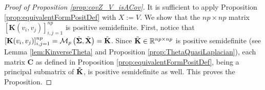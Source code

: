 \documentclass[12pt]{article}
\theoremstyle{plain}
\newtheorem{proposition}{Proposition}
\theoremstyle{remark}
\newtheorem{notation}{Notation}
\newcommand{\round}[1]{\left( #1 \right)}
\newcommand{\abs}[1]{\left| #1 \right|}
\newcommand{\R}[0]{\mathbb{R}}
\newcommand{\Mv}[3]{\mathcal{M}_{#1}\begin{pmatrix}
	#2\\
	#3
\end{pmatrix}}
\newcommand{\Mh}[3]{\mathcal{M}_{#1}\round{#2,#3}}
\newcommand{\latMatr}[1]{\mathbf{#1}}          %
\newcommand{\grMatr}[1]{{\boldsymbol{#1}}}   %
\newcommand{\matr}[1]{\mathbf{#1}}          %
\newcommand{\tobi}[1]{\textcolor{teal}{#1}}
\begin{document}
    \begin{proof}[Proof of Proposition \ref{prop:covZ_V_isACov}]
          It is sufficient to apply Proposition \ref{prop:equivalentFormPositDef} with $X:=V$. We show that the $np\times np$ matrix $[\latMatr K(v_i,v_j)]_{i,j=1}^{np}$ is positive semidefinite. First, notice that $[\latMatr K(v_i,v_j)]_{i,j=1}^{np}=\Mh{p}{\Tilde{\grMatr{\Sigma}}}{\Tilde{\latMatr X}}=\Tilde{\latMatr K}$. Since $\Tilde{\latMatr K}\in \R^{np \times np}$ is positive semidefinite (see Lemma \ref{lem:KinverseTheta} and Proposition \ref{prop:ThetaQuasiLaplacian}), each matrix ${\latMatr{C}}$ as defined in Proposition \ref{prop:equivalentFormPositDef}, being a principal submatrix of $\matr {\Tilde{\latMatr K}}$, is positive semidefinite as well. This proves the Proposition.
    \end{proof}
    
    
\end{document}

